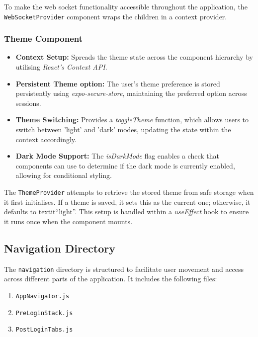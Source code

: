 To make the web socket functionality accessible throughout the application, the \texttt{WebSocketProvider} component wraps the children in a context provider.

\subsubsection{Theme Component}

\begin{itemize}
    \item \textbf{Context Setup:} Spreads the theme state across the component hierarchy by utilising \textit{React's Context API}.
    \item \textbf{Persistent Theme option:} The user's theme preference is stored persistently using \textit{expo-secure-store}, maintaining the preferred option across sessions.
    \item \textbf{Theme Switching:} Provides a \textit{toggleTheme} function, which allows users to switch between 'light' and 'dark' modes, updating the state within the context accordingly.
    \item \textbf{Dark Mode Support:} The \textit{isDarkMode} flag enables a check that components can use to determine if the dark mode is currently enabled, allowing for conditional styling.
\end{itemize}

The \texttt{ThemeProvider} attempts to retrieve the stored theme from safe storage when it first initialises. If a theme is saved, it sets this as the current one; otherwise, it defaults to textit{``light''}. This setup is handled within a \textit{useEffect} hook to ensure it runs once when the component mounts.

\subsection{Navigation Directory}

The \texttt{navigation} directory is structured to facilitate user movement and access across different parts of the application. It includes the following files:

\begin{enumerate}
    \item \texttt{AppNavigator.js}
    \item \texttt{PreLoginStack.js}
    \item \texttt{PostLoginTabs.js}
\end{enumerate}

